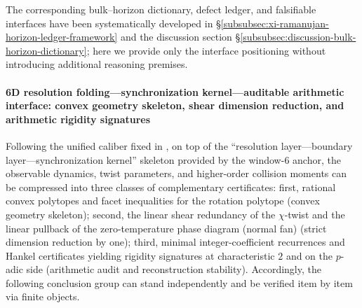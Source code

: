 The corresponding bulk--horizon dictionary, defect ledger, and falsifiable interfaces have been systematically developed in \S\ref{subsubsec:xi-ramanujan-horizon-ledger-framework} and the discussion section \S\ref{subsubsec:discussion-bulk-horizon-dictionary}; here we provide only the interface positioning without introducing additional reasoning premises.

\paragraph{6D resolution folding---synchronization kernel---auditable arithmetic interface: convex geometry skeleton, shear dimension reduction, and arithmetic rigidity signatures}
Following the unified caliber fixed in \cite{Internal2026POMGenerativeAddressThreeRegisterBridgeRH}, on top of the ``resolution layer---boundary layer---synchronization kernel'' skeleton provided by the window-\(6\) anchor, the observable dynamics, twist parameters, and higher-order collision moments can be compressed into three classes of complementary certificates: first, rational convex polytopes and facet inequalities for the rotation polytope (convex geometry skeleton); second, the linear shear redundancy of the \(\chi\)-twist and the linear pullback of the zero-temperature phase diagram (normal fan) (strict dimension reduction by one); third, minimal integer-coefficient recurrences and Hankel certificates yielding rigidity signatures at characteristic \(2\) and on the \(p\)-adic side (arithmetic audit and reconstruction stability). Accordingly, the following conclusion group can stand independently and be verified item by item via finite objects.

